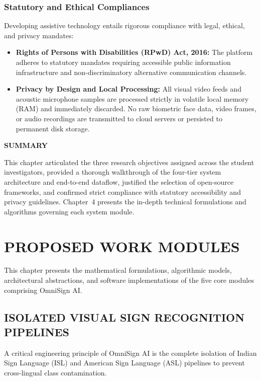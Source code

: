 \documentclass[12pt,a4paper]{report}
\begin{document}
\subsection{Statutory and Ethical Compliances}
Developing assistive technology entails rigorous compliance with legal, ethical, and privacy mandates:
\begin{itemize}[noitemsep, topsep=2pt]
\item \textbf{Rights of Persons with Disabilities (RPwD) Act, 2016:} The platform adheres to statutory mandates requiring accessible public information infrastructure and non-discriminatory alternative communication channels.
\item \textbf{Privacy by Design and Local Processing:} All visual video feeds and acoustic microphone samples are processed strictly in volatile local memory (RAM) and immediately discarded. No raw biometric face data, video frames, or audio recordings are transmitted to cloud servers or persisted to permanent disk storage.
\end{itemize}
\vspace{0.2cm}
\noindent\textbf{SUMMARY}\nopagebreak\par\vspace{0.1cm}
This chapter articulated the three research objectives assigned across the student investigators, provided a thorough walkthrough of the four-tier system architecture and end-to-end dataflow, justified the selection of open-source frameworks, and confirmed strict compliance with statutory accessibility and privacy guidelines. Chapter~4 presents the in-depth technical formulations and algorithms governing each system module.
\clearpage

\chapter{PROPOSED WORK MODULES} \label{chap:impl}
This chapter presents the mathematical formulations, algorithmic models, architectural abstractions, and software implementations of the five core modules comprising OmniSign AI.

\section{ISOLATED VISUAL SIGN RECOGNITION PIPELINES} \label{sec:impl-vision}
A critical engineering principle of OmniSign AI is the complete isolation of Indian Sign Language (ISL) and American Sign Language (ASL) pipelines to prevent cross-lingual class contamination.
\end{document}
